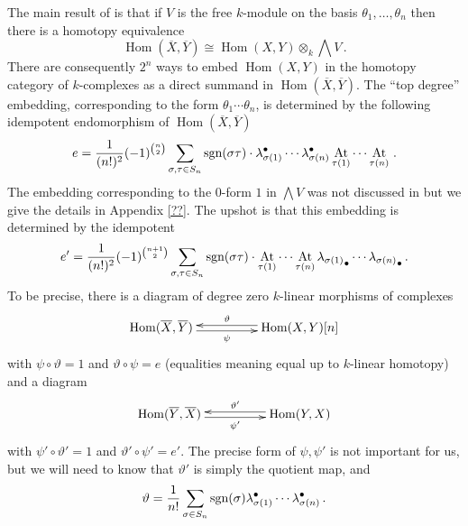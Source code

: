 \documentclass{compositio}
\theoremstyle{definition}
\numberwithin{equation}{section}
\def\Hom{\operatorname{Hom}}
\DeclareMathOperator{\At}{At}
\begin{document}
The main result of \cite{??} is that if $V$ is the free $k$-module on the basis $\theta_1,\ldots,\theta_n$ then there is a homotopy equivalence
\[
\Hom(\overline{X}, \overline{Y}) \cong \Hom(X,Y) \otimes_k \bigwedge V\,.
\]
There are consequently $2^n$ ways to embed $\Hom(X,Y)$ in the homotopy category of $k$-complexes as a direct summand in $\Hom(\overline{X}, \overline{Y})$. The ``top degree'' embedding, corresponding to the form $\theta_1 \cdots \theta_n$, is determined by the following idempotent endomorphism of $\Hom(\overline{X}, \overline{Y})$
\[
e = \frac{1}{(n!)^2} (-1)^{\binom{n}{2}}\sum_{\sigma,\tau \in S_n} \textup{sgn}(\sigma\tau) \cdot \lambda_{\sigma(1)}^\bullet \cdots \lambda_{\sigma(n)}^\bullet \At_{\tau(1)} \cdots \At_{\tau(n)}\,.
\]
The embedding corresponding to the $0$-form $1$ in $\bigwedge V$ was not discussed in \cite{??} but we give the details in Appendix \ref{??}. The upshot is that this embedding is determined by the idempotent
\[
e' = \frac{1}{(n!)^2} (-1)^{\binom{n+1}{2}}\sum_{\sigma, \tau \in S_n} \textup{sgn}(\sigma\tau) \cdot \At_{\tau(1)} \cdots \At_{\tau(n)} {\lambda_{\sigma(1)}}_\bullet \cdots {\lambda_{\sigma(n)}}_\bullet\,.
\]
To be precise, there is a diagram of degree zero $k$-linear morphisms of complexes
\[
\xymatrix@C+2pc{
\Hom(\overline{X}, \overline{Y}) \ar@<-0.5ex>[r]_-{\psi} & \Hom(X,Y)[n] \ar@<-0.5ex>[l]_-{\vartheta}
}
\]
with $\psi \circ \vartheta = 1$ and $\vartheta \circ \psi = e$ (equalities meaning equal up to $k$-linear homotopy) and a diagram
\[
\xymatrix@C+2pc{
\Hom(\overline{Y}, \overline{X}) \ar@<-0.5ex>[r]_-{\psi'} & \Hom(Y,X) \ar@<-0.5ex>[l]_-{\vartheta'}
}
\]
with $\psi' \circ \vartheta' = 1$ and $\vartheta' \circ \psi' = e'$. The precise form of $\psi, \psi'$ is not important for us, but we will need to know that $\vartheta'$ is simply the quotient map, and
\[
\vartheta = \frac{1}{n!} \sum_{\sigma \in S_n} \textup{sgn}(\sigma) \lambda_{\sigma(1)}^\bullet \cdots \lambda_{\sigma(n)}^{\bullet}\,.
\]
\end{document}
